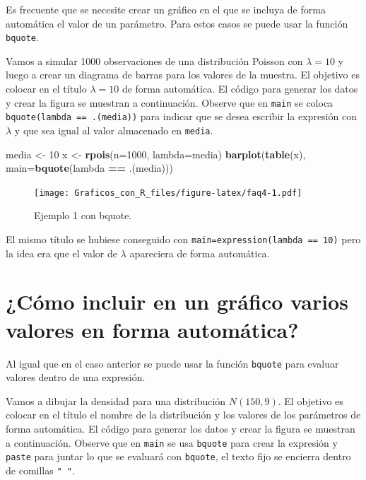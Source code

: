 \documentclass[10pt,]{krantz}
\makeatletter
\newenvironment{Shaded}{\begin{snugshade}}{\end{snugshade}}
\newcommand{\KeywordTok}[1]{\textcolor[rgb]{0.13,0.29,0.53}{\textbf{#1}}}
\newcommand{\DataTypeTok}[1]{\textcolor[rgb]{0.13,0.29,0.53}{#1}}
\newcommand{\DecValTok}[1]{\textcolor[rgb]{0.00,0.00,0.81}{#1}}
\newcommand{\StringTok}[1]{\textcolor[rgb]{0.31,0.60,0.02}{#1}}
\newcommand{\OperatorTok}[1]{\textcolor[rgb]{0.81,0.36,0.00}{\textbf{#1}}}
\newcommand{\NormalTok}[1]{#1}
\newenvironment{kframe}{%
\medskip{}
\setlength{\fboxsep}{.8em}
 \def\at@end@of@kframe{}%
 \ifinner\ifhmode%
  \def\at@end@of@kframe{\end{minipage}}%
  \begin{minipage}{\columnwidth}%
 \fi\fi%
 \def\FrameCommand##1{\hskip\@totalleftmargin \hskip-\fboxsep
 \colorbox{shadecolor}{##1}\hskip-\fboxsep
     \hskip-\linewidth \hskip-\@totalleftmargin \hskip\columnwidth}%
 \MakeFramed {\advance\hsize-\width
   \@totalleftmargin\z@ \linewidth\hsize
   \@setminipage}}%
 {\par\unskip\endMakeFramed%
 \at@end@of@kframe}
\renewenvironment{Shaded}{\begin{kframe}}{\end{kframe}}
\makeatother
\begin{document}
Es frecuente que se necesite crear un gráfico en el que se incluya de
forma automática el valor de un parámetro. Para estos casos se puede
usar la función \texttt{bquote}.

Vamos a simular 1000 observaciones de una distribución Poisson con
\(\lambda=10\) y luego a crear un diagrama de barras para los valores de
la muestra. El objetivo es colocar en el título \(\lambda=10\) de forma
automática. El código para generar los datos y crear la figura se
muestran a continuación. Observe que en \texttt{main} se coloca
\texttt{bquote(lambda\ ==\ .(media))} para indicar que se desea escribir
la expresión con \(\lambda\) y que sea igual al valor almacenado en
\texttt{media}.

\begin{Shaded}
\begin{Highlighting}[]
\NormalTok{media <-}\StringTok{ }\DecValTok{10}
\NormalTok{x <-}\StringTok{ }\KeywordTok{rpois}\NormalTok{(}\DataTypeTok{n=}\DecValTok{1000}\NormalTok{, }\DataTypeTok{lambda=}\NormalTok{media)}
\KeywordTok{barplot}\NormalTok{(}\KeywordTok{table}\NormalTok{(x), }\DataTypeTok{main=}\KeywordTok{bquote}\NormalTok{(lambda }\OperatorTok{==}\StringTok{ }\NormalTok{.(media)))}
\end{Highlighting}
\end{Shaded}

\begin{figure}
\centering
\texttt{[image: Graficos\_con\_R\_files/figure-latex/faq4-1.pdf]}
\caption{\label{fig:faq4}Ejemplo 1 con bquote.}
\end{figure}

El mismo título se hubiese conseguido con
\texttt{main=expression(lambda\ ==\ 10)} pero la idea era que el valor
de \(\lambda\) apareciera de forma automática.

\section{¿Cómo incluir en un gráfico varios valores en forma
automática?}\label{como-incluir-en-un-grafico-varios-valores-en-forma-automatica}

Al igual que en el caso anterior se puede usar la función
\texttt{bquote} para evaluar valores dentro de una expresión.

Vamos a dibujar la densidad para una distribución \(N(150, 9)\). El
objetivo es colocar en el título el nombre de la distribución y los
valores de los parámetros de forma automática. El código para generar
los datos y crear la figura se muestran a continuación. Observe que en
\texttt{main} se usa \texttt{bquote} para crear la expresión y
\texttt{paste} para juntar lo que se evaluará con \texttt{bquote}, el
texto fijo se encierra dentro de comillas \texttt{"\ "}.
\end{document}
